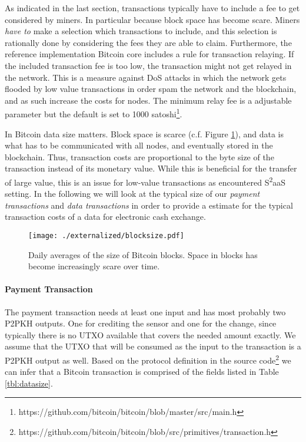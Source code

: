 As indicated in the last section, transactions typically have to include a fee to get considered by miners. In particular because block space has become scare. Miners \emph{have to} make a selection which transactions to include, and this selection is rationally done by considering the fees they are able to claim. Furthermore, the reference implementation Bitcoin core includes a rule for transaction relaying. If the included transaction fee is too low, the transaction might not get relayed in the network. This is a measure against \ac{DoS} attacks in which the network gets flooded by low value transactions in order spam the network and the blockchain, and as such increase the costs for nodes.
The minimum relay fee is a adjustable parameter but the default is set to 1000 satoshi\footnote{https://github.com/bitcoin/bitcoin/blob/master/src/main.h}.

In Bitcoin data size matters. Block space is scarce (c.f. Figure \ref{fig:blocksize_btc}), and data is what has to be communicated with all nodes, and eventually stored in the blockchain. Thus, transaction costs are proportional to the byte size of the transaction instead of its monetary value. While this is beneficial for the transfer of large value, this is an issue for low-value transactions as encountered S\textsuperscript{2}aaS setting. In the following we will look at the typical size of our \emph{payment transactions} and \emph{data transactions} in order to provide a estimate for the typical transaction costs of a data for electronic cash exchange.

\begin{figure}
  \centering
    \centering\texttt{[image: ./externalized/blocksize.pdf]}
    \caption{Daily averages of the size of Bitcoin blocks. Space in blocks has become increasingly scare over time.}
    \label{fig:blocksize_btc}
\end{figure}

\paragraph{Payment Transaction}
The payment transaction needs at least one input and has most probably two \ac{P2PKH} outputs. One for crediting the sensor and one for the change, since typically there is no \ac{UTXO} available that covers the needed amount exactly.
We assume that the \ac{UTXO} that will be consumed as the input to the transaction is a \ac{P2PKH} output as well.
Based on the protocol definition in the source code\footnote{https://github.com/bitcoin/bitcoin/blob/src/primitives/transaction.h} we can infer that a Bitcoin transaction is comprised of the fields listed in Table \ref{tbl:datasize}.

